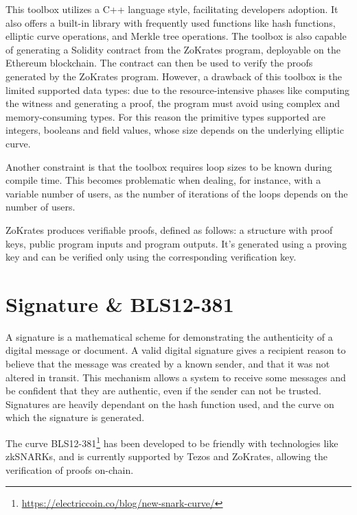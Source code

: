 This toolbox utilizes a C++ language style, facilitating developers adoption. It also offers a built-in library with frequently used functions like hash functions, elliptic curve operations, and Merkle tree operations. The toolbox is also capable of generating a Solidity contract from the ZoKrates program, deployable on the Ethereum blockchain. The contract can then be used to verify the proofs generated by the ZoKrates program. However, a drawback of this toolbox is the limited supported data types: due to the resource-intensive phases like computing the witness and generating a proof, the program must avoid using complex and memory-consuming types. For this reason the primitive types supported are integers, booleans and field values, whose size depends on the underlying elliptic curve.

Another constraint is that the toolbox requires loop sizes to be known during compile time. This becomes problematic when dealing, for instance, with a variable number of users, as the number of iterations of the loops depends on the number of users.

ZoKrates produces verifiable proofs, defined as follows: a structure with proof keys, public program inputs and program outputs. It's generated using a proving key and can be verified only using the corresponding verification key.

\section{Signature \& BLS12-381}

A signature is a mathematical scheme for demonstrating the authenticity of a digital message or document. A valid digital signature gives a recipient reason to believe that the message was created by a known sender, and that it was not altered in transit. This mechanism allows a system to receive some messages and be confident that they are authentic, even if the sender can not be trusted. Signatures are heavily dependant on the hash function used, and the curve on which the signature is generated.

The curve BLS12-381\footnote{\url{https://electriccoin.co/blog/new-snark-curve/}} has been developed to be friendly with technologies like zkSNARKs, and is currently supported by Tezos and ZoKrates, allowing the verification of proofs on-chain.